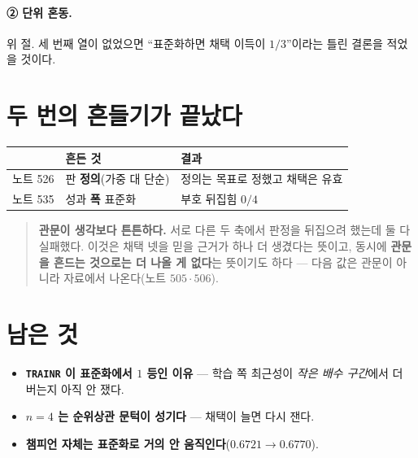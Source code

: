 \documentclass[11pt]{article}
\begin{document}
\paragraph{② 단위 혼동.} 위 절. 세 번째 열이 없었으면 ``표준화하면 채택
이득이 $1/3$''이라는 틀린 결론을 적었을 것이다.

\section*{두 번의 흔들기가 끝났다}

\begin{center}
\begin{tabular}{lll}
\hline
 & 흔든 것 & 결과 \\
\hline
노트 526 & 판 \textbf{정의}(가중 대 단순) & 정의는 목표로 정했고 채택은 유효 \\
노트 535 & 성과 \textbf{폭} 표준화 & 부호 뒤집힘 $0/4$ \\
\hline
\end{tabular}
\end{center}

\begin{quote}
\textbf{관문이 생각보다 튼튼하다.} 서로 다른 두 축에서 판정을 뒤집으려
했는데 둘 다 실패했다. 이것은 채택 넷을 믿을 근거가 하나 더 생겼다는 뜻이고,
동시에 \textbf{관문을 흔드는 것으로는 더 나올 게 없다}는 뜻이기도 하다 ---
다음 값은 관문이 아니라 자료에서 나온다(노트 $505 \cdot 506$).
\end{quote}

\section*{남은 것}

\begin{itemize}
\item \textbf{\texttt{TRAINR} 이 표준화에서 $1$ 등인 이유} --- 학습 쪽 최근성이
\emph{작은 배수 구간}에서 더 버는지 아직 안 쟀다.
\item \textbf{$n=4$ 는 순위상관 문턱이 성기다} --- 채택이 늘면 다시 잰다.
\item \textbf{챔피언 자체는 표준화로 거의 안 움직인다}($0.6721 \to 0.6770$).
\end{itemize}
\end{document}
